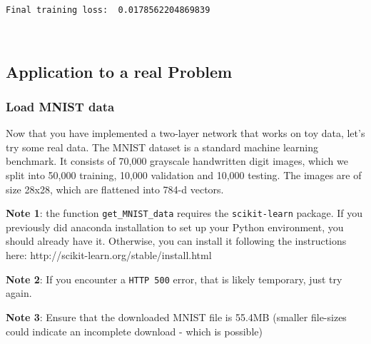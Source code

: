 \documentclass[11pt]{article}
\begin{document}
    \begin{Verbatim}[commandchars=\\\{\}]
Final training loss:  0.0178562204869839
    \end{Verbatim}

    \begin{center}
    \end{center}
    { \hspace*{\fill} \\}
    
    \hypertarget{application-to-a-real-problem}{%
\subsection{Application to a real
Problem}\label{application-to-a-real-problem}}

\hypertarget{load-mnist-data}{%
\subsubsection{Load MNIST data}\label{load-mnist-data}}

Now that you have implemented a two-layer network that works on toy
data, let's try some real data. The MNIST dataset is a standard machine
learning benchmark. It consists of 70,000 grayscale handwritten digit
images, which we split into 50,000 training, 10,000 validation and
10,000 testing. The images are of size 28x28, which are flattened into
784-d vectors.

\textbf{Note 1}: the function \texttt{get\_MNIST\_data} requires the
\texttt{scikit-learn} package. If you previously did anaconda
installation to set up your Python environment, you should already have
it. Otherwise, you can install it following the instructions here:
http://scikit-learn.org/stable/install.html

\textbf{Note 2}: If you encounter a \texttt{HTTP\ 500} error, that is
likely temporary, just try again.

\textbf{Note 3}: Ensure that the downloaded MNIST file is 55.4MB
(smaller file-sizes could indicate an incomplete download - which is
possible)
\end{document}
